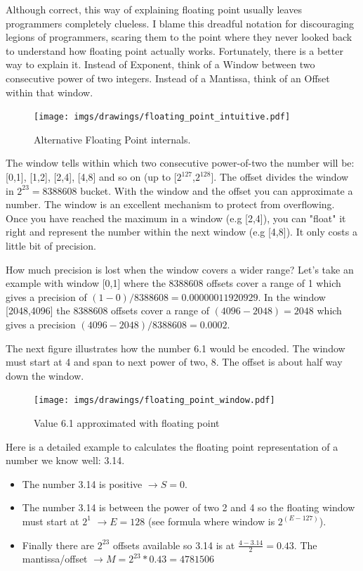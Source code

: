 \documentclass[book.tex]{subfiles}
\begin{document}
Although correct, this way of explaining floating point usually leaves programmers completely clueless. I blame this dreadful notation for discouraging legions of programmers, scaring them to the point where they never looked back to understand how floating point actually works. Fortunately, there is a better way to explain it. Instead of Exponent, think of a Window between two consecutive power of two integers. Instead of a Mantissa, think of an Offset within that window.\\ 
\par
  
\begin{figure}[H]
\centering
\texttt{[image: imgs/drawings/floating\_point\_intuitive.pdf]}
\caption{Alternative Floating Point internals.}
\end{figure}
  \bigskip  
The window tells within which two consecutive power-of-two the number will be: [0,1], [1,2], [2,4], [4,8] and so on (up to [$2^{127}$,$2^{128}$]. The offset divides the window in $ 2^{23} = 8388608 $  bucket. With the window and the offset you can approximate a number. The window is an excellent mechanism to protect from overflowing. Once you have reached the maximum in a window (e.g [2,4]), you can "float" it right and represent the number within the next window (e.g [4,8]). It only costs a little bit of precision.\\


\par {} How much precision is lost when the window covers a wider range? Let's take an example with window [0,1] where the 8388608 offsets cover a range of 1 which gives a precision of $(1-0)/8388608=0.00000011920929$. In the window [2048,4096] the 8388608 offsets cover a range of $(4096-2048) = 2048$ which gives a precision $ (4096-2048)/8388608=0.0002$.\\
\par

The next figure illustrates how the number 6.1 would be encoded. The window must start at 4 and span to next power of two, 8. The offset is about half way down the window.

\begin{figure}[H]
\centering
\texttt{[image: imgs/drawings/floating\_point\_window.pdf]}

\caption{Value 6.1 approximated with floating point}
\label{fig:fp_internals_window6_1}
\end{figure}
  \bigskip
  
Here is a detailed example to calculates the floating point representation of a number we know well: 3.14.
\begin{itemize}
 \item The number 3.14 is positive  $\rightarrow S=0$.
 \item The number 3.14 is between the power of two 2 and 4 so the floating window must start at $2^1$  $\rightarrow E=128$ (see formula where window is $2^{(E-127)}$).
 \item Finally there are $2^{23}$ offsets available so 3.14 is at $\frac{4-3.14}{2} = 0.43 $. The mantissa/offset $\rightarrow M = 2^{23}*0.43 = 4781506$
\end{itemize}
\end{document}
